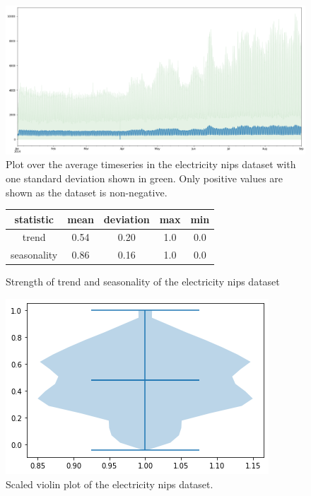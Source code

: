\begin{figure}[htb]
  \centering
  \includegraphics[width=\linewidth]{./img/electricity_nips_plot.png}
  \caption{Plot over the average timeseries in the electricity nips dataset with one standard deviation shown in green. Only positive values are shown as the dataset is non-negative.}
  \label{fig:electricity_nips_plot}
  \endminipage\hfill
\end{figure}

\begin{figure}[htb]
  \centering
  \begin{center}
    \begin{tabular}{||c | c | c | c | c |}
      \hline
      statistic   & mean & deviation & max & min \\
      \hline
      trend       & 0.54 & 0.20      & 1.0 & 0.0 \\
      \hline
      seasonality & 0.86 & 0.16      & 1.0 & 0.0 \\
      \hline
      \hline
    \end{tabular}
    \caption{Strength of trend and seasonality of the electricity nips dataset}
  \end{center}
  \endminipage\hfill
  \includegraphics[width=\linewidth]{./img/electricity_nips_violin.png}
  \caption{Scaled violin plot of the electricity nips dataset.}
  \label{fig:electricity_nips_violin}
  \endminipage\hfill
\end{figure}

